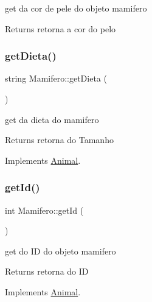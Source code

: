 get da cor de pele do objeto mamifero 

\begin{DoxyReturn}{Returns}
retorna a cor do pelo 
\end{DoxyReturn}
\mbox{\label{class_mamifero_ad57356460a0ca116426126c8147b1efa}} 
\subsubsection{\texorpdfstring{getDieta()}{getDieta()}}
{\footnotesize\ttfamily string Mamifero\+::get\+Dieta (\begin{DoxyParamCaption}{ }\end{DoxyParamCaption})\hspace{0.3cm}{\ttfamily [virtual]}}



get da dieta do mamifero 

\begin{DoxyReturn}{Returns}
retorna do Tamanho 
\end{DoxyReturn}


Implements \mbox{\hyperlink{class_animal}{Animal}}.

\mbox{\label{class_mamifero_a250ae71fe8447cef6b358c12d155faeb}} 
\subsubsection{\texorpdfstring{getId()}{getId()}}
{\footnotesize\ttfamily int Mamifero\+::get\+Id (\begin{DoxyParamCaption}{ }\end{DoxyParamCaption})\hspace{0.3cm}{\ttfamily [virtual]}}



get do ID do objeto mamifero 

\begin{DoxyReturn}{Returns}
retorna do ID 
\end{DoxyReturn}


Implements \mbox{\hyperlink{class_animal}{Animal}}.

\mbox{\label{class_mamifero_a980ee6acb8aa3774e81349e4d0de3857}} 
